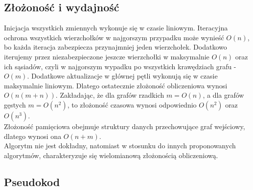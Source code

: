     \subsection{Złożoność i wydajność}

    Inicjacja wszystkich zmiennych wykonuje się w czasie liniowym. Iteracyjna ochrona wszystkich wierzchołków w najgorszym przypadku może wynieść $O(n)$, bo każda iteracja zabezpiecza przynajmniej jeden wierzchołek. Dodatkowo iterujemy przez niezabezpieczone jeszcze wierzchołki w maksymalnie $O(n)$ oraz ich sąsiadów, czyli w najgorszym wypadku po wszystkich krawędziach grafu - $O(m)$. Dodatkowe aktualizacje w głównej pętli wykonują się w czasie maksymalnie liniowym. Dlatego ostatecznie złożoność obliczeniowa wynosi $O(n(m+n))$. Zakładając, że dla grafów rzadkich $m=O(n)$, a dla grafów gęstych $m=O(n^2)$, to złożoność czasowa wynosi odpowiednio $O(n^2)$ oraz $O(n^3)$.\\
    Złożoność pamięciowa obejmuje struktury danych przechowujące graf wejściowy, dlatego wynosi ona $O(n+m)$.\\
    Algorytm nie jest dokładny, natomiast w stosunku do innych proponowanych algorytmów, charakteryzuje się wielomianową złożonością obliczeniową.
    
    \subsection{Pseudokod}

